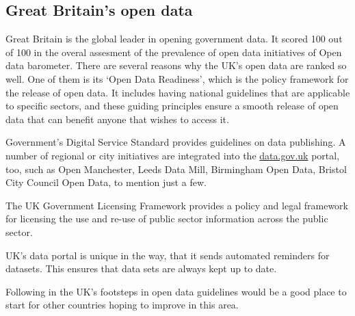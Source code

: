 \documentclass[thesis=B,english]{FITthesis}[2012/06/26]
\begin{document}
  \subsection{Great Britain's open data}
  Great Britain is the global leader in opening government data. It scored 100 out of 100 in the overal assesment of the prevalence of open data initiatives of Open data barometer.
  There are several reasons why the UK's open data are ranked so well. One of them is its ‘Open Data Readiness’, which is the policy framework for the release of open data. It includes having national guidelines that are applicable to specific sectors, and these guiding principles ensure a smooth release of open data that can benefit anyone that wishes to access it.

Government’s Digital Service Standard provides guidelines on data publishing. A number of regional or city initiatives are integrated into the \href{https://data.gov.uk}{data.gov.uk} portal, too, such as Open Manchester, Leeds Data Mill, Birmingham Open Data, Bristol City Council Open Data, to mention just a few.

The UK Government Licensing Framework provides a policy and legal framework for licensing the use and re-use of public sector information across the public sector. 

UK’s data portal is unique in the way, that it sends automated reminders for datasets. This ensures that data sets are always kept up to date.

Following in the UK’s footsteps in open data guidelines would be a good place to start for other countries hoping to improve in this area.\cite{UKopendatagov}
\end{document}
